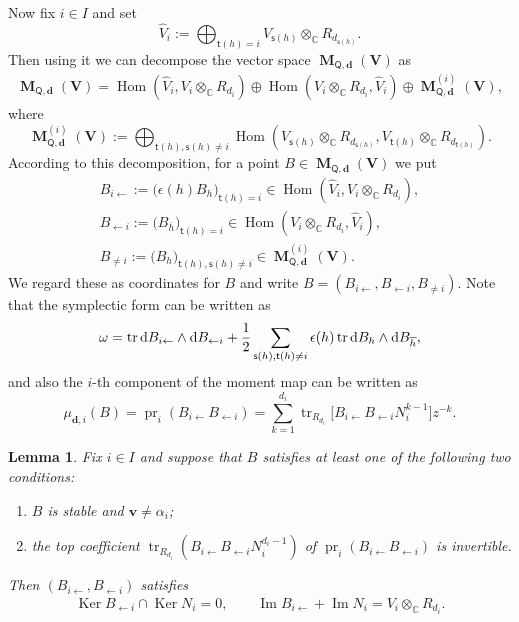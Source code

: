 \documentclass[11pt]{article}
\newcommand{\shortleftarrow}{\leftarrow}
\newcommand{\slar}{\shortleftarrow}
\newenvironment{enm}%
{\begin{enumerate}
\setlength{\itemsep}{0em}
}%
{\end{enumerate}}
\numberwithin{equation}{section}
\newtheorem{Lemma}[Theorem]{Lemma}
\theoremstyle{definition}
\newcommand{\C}{\mathbb{C}} %
\newcommand{\Hom}{\operatorname{Hom}}
\newcommand{\Ker}{\operatorname{Ker}}
\newcommand{\range}{\operatorname{Im}}
\newcommand{\tr}{\operatorname{tr}}
\newcommand{\prj}{\operatorname{pr}}
\newcommand{\bM}{\operatorname{\mathbf{M}}}
\newcommand{\bV}{\mathbf{V}}
\newcommand{\bv}{\mathbf{v}}
\newcommand{\ov}{\overline}
\newcommand{\ved}{\mathbf{d}}
\newcommand{\vin}{\mathsf{t}} %
\newcommand{\vout}{\mathsf{s}} %
\newcommand{\QQ}{\mathsf{Q}} %
\newcommand{\rd}{\mathop{\mathrm{d}\!}\mathstrut}
\begin{document}
Now f\/ix $i \in I$ and set
\[
\widehat{V}_i := \bigoplus_{\vin(h)=i}
V_{\vout(h)} \otimes_\C R_{d_{\vout(h)}}.
\]
Then using it we can decompose the vector space $\bM_{\QQ,\ved}(\bV)$ as
\begin{gather}\label{eq:decomposition}
\bM_{\QQ,\ved}(\bV) =\Hom(\widehat{V}_i,V_i \otimes_\C R_{d_i})
\oplus \Hom(V_i \otimes_\C R_{d_i}, \widehat{V}_i)
\oplus \bM^{(i)}_{\QQ,\ved}(\bV),
\end{gather}
where
\[
\bM^{(i)}_{\QQ,\ved}(\bV) := \bigoplus_{\vin(h), \vout(h) \neq i}
\Hom(V_{\vout(h)} \otimes_\C R_{d_{\vout(h)}},
V_{\vin(h)} \otimes_\C R_{d_{\vin(h)}}).
\]
According to this decomposition,
for a point $B \in \bM_{\QQ,\ved}(\bV)$ we put
\begin{gather*}
B_{i \slar}  := \bigl( \epsilon(h) B_h \bigr)_{\vin(h)=i}
\in \Hom(\widehat{V}_i,V_i \otimes_\C R_{d_i}), \\
B_{\slar i}  := \bigl( B_{\ov{h}} \bigr)_{\vin(h)=i}
\in \Hom(V_i \otimes_\C R_{d_i},\widehat{V}_i), \\
B_{\neq i}  := \bigl( B_h \bigr)_{\vin(h), \vout(h) \neq i}
\in \bM^{(i)}_{\QQ,\ved}(\bV).
\end{gather*}
We regard these as coordinates for $B$ and
write $B=(B_{i \slar},B_{\slar i},B_{\neq i})$.
Note that the symplectic form can be written as
\begin{gather}\label{eq:decomposeform}
\omega = \tr \rd B_{i \slar} \wedge \rd B_{\slar i}
+ \frac12 \sum_{\vout(h),\vin(h) \neq i}
\epsilon(h) \tr \rd B_h \wedge \rd B_{\ov{h}},
\end{gather}
and also the $i$-th component of the moment map can be written as
\[
\mu_{\ved,i}(B) = \prj_i (B_{i \slar} B_{\slar i})
= \sum_{k=1}^{d_i}
\tr_{R_{d_i}} \bigl[ B_{i \slar}  B_{\slar i} N_i^{k-1} \bigr]  z^{-k}.
\]

\begin{Lemma}\label{lem:stability}
Fix $i \in I$ and
suppose that $B$ satisfies at least one of the following two conditions:
\begin{enm}
\item $B$ is stable and $\bv \neq \alpha_i$;
\item the top coefficient
$\tr_{R_{d_i}}(B_{i \slar}  B_{\slar i} N_i^{d_i-1})$
of $\prj_i(B_{i \slar}B_{\slar i})$ is invertible.
\end{enm}
Then $(B_{i \slar},B_{\slar i})$ satisfies
\begin{gather}\label{eq:stability}
\Ker B_{\slar i} \cap \Ker N_i =0, \qquad
\range B_{i \slar} + \range N_i = V_i \otimes_\C R_{d_i}.
\end{gather}
\end{Lemma}
\end{document}
